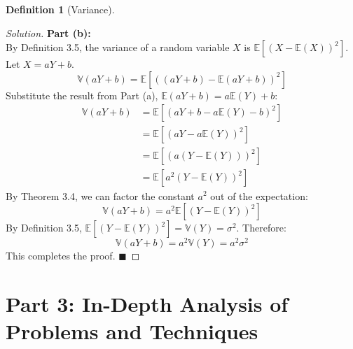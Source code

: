 \documentclass[11pt,letterpaper]{article}
\theoremstyle{definition}
\newtheorem{definition}{Definition}[section]
\theoremstyle{plain}
\theoremstyle{remark}
\newcommand{\E}{\mathbb{E}}
\newcommand{\V}{\mathbb{V}}
\begin{document}
\begin{definition}[Variance]
\begin{proof}[Solution]
\textbf{Part (b):}\\
By Definition 3.5, the variance of a random variable $X$ is $\E[(X - \E(X))^2]$. Let $X = aY + b$.
\[ \V(aY + b) = \E\left[ \left( (aY + b) - \E(aY + b) \right)^2 \right] \]
Substitute the result from Part (a), $\E(aY + b) = a\E(Y) + b$:
\begin{align*}
\V(aY + b) &= \E\left[ \left( aY + b - a\E(Y) - b \right)^2 \right] \\
&= \E\left[ \left( aY - a\E(Y) \right)^2 \right] \\
&= \E\left[ \left( a(Y - \E(Y)) \right)^2 \right] \\
&= \E\left[ a^2 (Y - \E(Y))^2 \right]
\end{align*}
By Theorem 3.4, we can factor the constant $a^2$ out of the expectation:
\[ \V(aY + b) = a^2 \E\left[ (Y - \E(Y))^2 \right] \]
By Definition 3.5, $\E\left[ (Y - \E(Y))^2 \right] = \V(Y) = \sigma^2$. Therefore:
\[ \V(aY + b) = a^2 \V(Y) = a^2 \sigma^2 \]
This completes the proof. $\blacksquare$
\end{proof}

\newpage
\section{Part 3: In-Depth Analysis of Problems and Techniques}


\end{definition}
\end{document}

